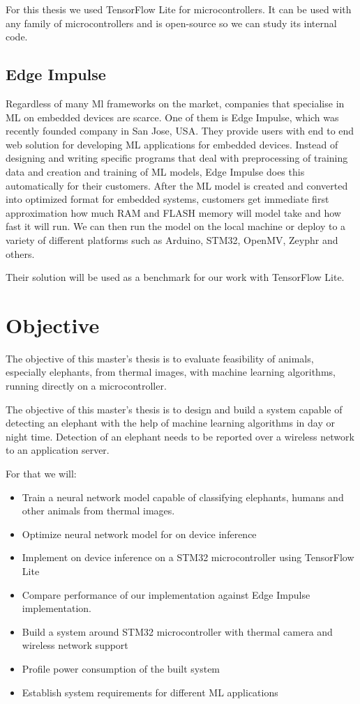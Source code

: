 For this thesis we used TensorFlow Lite for microcontrollers.
It can be used with any family of microcontrollers and is open-source so we can study its internal code.


\subsection{ Edge Impulse}

Regardless of many Ml frameworks on the market, companies that specialise in ML on embedded devices are scarce.
One of them is Edge Impulse, which was recently founded company in San Jose, USA.
They provide users with end to end web solution for developing ML applications for embedded devices.
Instead of designing and writing specific programs that deal with preprocessing of training data and creation and training of ML models, Edge Impulse does this automatically for their customers.
After the ML model is created and converted into optimized format for embedded systems, customers get immediate first approximation how much RAM and FLASH memory will model take and how fast it will run.
We can then run the model on the local machine or deploy to a variety of different platforms such as Arduino, STM32, OpenMV, Zeyphr and others.

Their solution will be used as a benchmark for our work with TensorFlow Lite.


\section{ Objective}\label{objective}

The objective of this master's thesis is to evaluate feasibility of  animals, especially elephants, from thermal images, with machine learning algorithms, running directly on a microcontroller.

The objective of this master's thesis is to design and build a system capable of detecting an elephant with the help of machine learning algorithms in day or night time.
Detection of an elephant needs to be reported over a wireless network to an application server.

For that we will:

\begin{itemize}
    \item Train a neural network model capable of classifying elephants, humans and other animals from thermal images.
    \item Optimize neural network model for on device inference
    \item Implement on device inference on a STM32 microcontroller using TensorFlow Lite
    \item Compare performance of our implementation against Edge Impulse implementation.
    \item Build a system around STM32 microcontroller with thermal camera and wireless network support
    \item Profile power consumption of the built system
    \item Establish system requirements for different ML applications
\end{itemize}


